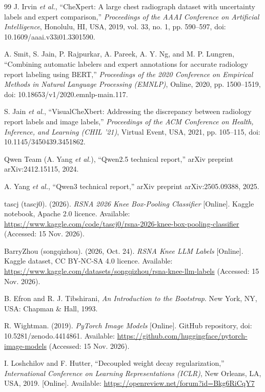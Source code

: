 \begin{thebibliography}{99}
 J. Irvin \textit{et al.}, ``CheXpert: A large chest radiograph dataset with uncertainty labels and expert comparison,'' \textit{Proceedings of the AAAI Conference on Artificial Intelligence}, Honolulu, HI, USA, 2019, vol. 33, no. 1, pp. 590--597, doi: 10.1609/aaai.v33i01.3301590.

 A. Smit, S. Jain, P. Rajpurkar, A. Pareek, A. Y. Ng, and M. P. Lungren, ``Combining automatic labelers and expert annotations for accurate radiology report labeling using BERT,'' \textit{Proceedings of the 2020 Conference on Empirical Methods in Natural Language Processing (EMNLP)}, Online, 2020, pp. 1500--1519, doi: 10.18653/v1/2020.emnlp-main.117.

 S. Jain \textit{et al.}, ``VisualCheXbert: Addressing the discrepancy between radiology report labels and image labels,'' \textit{Proceedings of the ACM Conference on Health, Inference, and Learning (CHIL '21)}, Virtual Event, USA, 2021, pp. 105--115, doi: 10.1145/3450439.3451862.

 Qwen Team (A. Yang \textit{et al.}), ``Qwen2.5 technical report,'' arXiv preprint arXiv:2412.15115, 2024.

 A. Yang \textit{et al.}, ``Qwen3 technical report,'' arXiv preprint arXiv:2505.09388, 2025.

 tascj (tascj0). (2026). \textit{RSNA 2026 Knee Box-Pooling Classifier} [Online]. Kaggle notebook, Apache 2.0 licence. Available: \url{https://www.kaggle.com/code/tascj0/rsna-2026-knee-box-pooling-classifier} (Accessed: 15 Nov. 2026).

 BarryZhou (songqizhou). (2026, Oct. 24). \textit{RSNA Knee LLM Labels} [Online]. Kaggle dataset, CC BY-NC-SA 4.0 licence. Available: \url{https://www.kaggle.com/datasets/songqizhou/rsna-knee-llm-labels} (Accessed: 15 Nov. 2026).

 B. Efron and R. J. Tibshirani, \textit{An Introduction to the Bootstrap}. New York, NY, USA: Chapman \& Hall, 1993.

 R. Wightman. (2019). \textit{PyTorch Image Models} [Online]. GitHub repository, doi: 10.5281/zenodo.4414861. Available: \url{https://github.com/huggingface/pytorch-image-models} (Accessed: 15 Nov. 2026).

 I. Loshchilov and F. Hutter, ``Decoupled weight decay regularization,'' \textit{International Conference on Learning Representations (ICLR)}, New Orleans, LA, USA, 2019. [Online]. Available: \url{https://openreview.net/forum?id=Bkg6RiCqY7}


\end{thebibliography}
